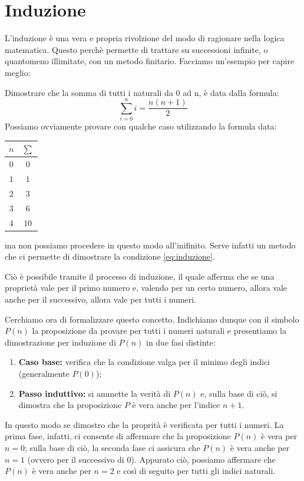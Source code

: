 \chapter{Induzione}
L'induzione è una vera e propria rivolzione del modo di ragionare nella logica matematica.
Questo perchè permette di trattare su successioni infinite, o quantomeno illimitate, con un metodo finitario.
Facciamo un'esempio per capire meglio:
\begin{example}\label{ex:induzione}
    Dimostrare che la somma di tutti i naturali da 0 ad n, è data dalla formula:\begin{equation}\label{eq:induzione}
        \sum_{i=0}^ni=\frac{n(n+1)}{2}
    \end{equation}
    Possiamo ovviamente provare con qualche caso utilizzando la formula data:
    \begin{center}
    \begin{tabular}{c|c}
         $n$ & $\sum$ \\\hline
         $0$ & $0$ \\
         $1$ & $1$ \\
         $2$ & $3$ \\
         $3$ & $6$ \\
         $4$ & $10$
    \end{tabular}
    \end{center}
    ma non possiamo procedere in questo modo  all'inifinito. Serve infatti un metodo che ci permette di dimostrare la condizione \ref{eq:induzione}.
\end{example}
Ciò è possibile tramite il processo di induzione, il quale afferma che se una proprietà vale per il primo numero e, valendo per un certo numero, allora vale anche per il successivo, allora vale per tutti i numeri.

Cerchiamo ora di formalizzare questo concetto. Indichiamo dunque con il simbolo $P (n)$ la proposizione da provare per tutti i numeri naturali e presentiamo la dimostrazione per induzione di $P (n)$ in due fasi distinte:
\begin{enumerate}
    \item \textbf{Caso base:} verifica che la condizione valga per il minimo degli indici (generalmente $P(0)$);
    \item \textbf{Passo induttivo:} si ammette la verità di $P (n)$ e, sulla base di ciò, si dimostra che la proposizione $P$ è vera anche per l’indice $n + 1$.
\end{enumerate}

In questo modo se dimostro che la proprità è verificata per tutti i numeri. La prima fase, infatti, ci consente di affermare che la proposizione $P (n)$ è vera per $n=0$; sulla base di ciò, la seconda fase ci assicura che $P (n)$ è vera anche per $n= 1$ (ovvero per il successivo di 0). Appurato ciò, possiamo affermare che $P(n)$ è vera anche per $n = 2$ e così di seguito per tutti gli indici naturali.

